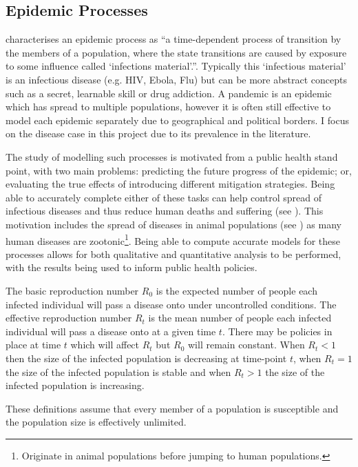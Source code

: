 \documentclass[11pt,a4paper]{article}
\theoremstyle{break}
\begin{document}
\subsection{Epidemic Processes}

  \par \cite[]{epidemic_process_in_an_open_population} characterises an epidemic process as ``a time-dependent process of transition by the members of a population, where the state transitions are caused by exposure to some influence called `infections material'.''. Typically this `infectious material' is an infectious disease (e.g. HIV, Ebola, Flu) but can be more abstract concepts such as a secret, learnable skill or drug addiction. A pandemic is an epidemic which has spread to multiple populations, however it is often still effective to model each epidemic separately due to geographical and political borders. I focus on the disease case in this project due to its prevalence in the literature.

  \par The study of modelling such processes is motivated from a public health stand point, with two main problems: predicting the future progress of the epidemic; or, evaluating the true effects of introducing different mitigation strategies. Being able to accurately complete either of these tasks can help control spread of infectious diseases and thus reduce human deaths and suffering (see \cite[]{mitigation_measures_for_pandemic_influence_in_italy}). This motivation includes the spread of diseases in animal populations (see \cite[]{dynamic_model_of_bovine_tb_spread_and_control_in_great_britain}) as many human diseases are zootonic\footnote{Originate in animal populations before jumping to human populations.}. Being able to compute accurate models for these processes allows for both qualitative and quantitative analysis to be performed, with the results being used to inform public health policies.

  \begin{box_definition}
    The basic reproduction number $R_0$ is the expected number of people each infected individual will pass a disease onto under uncontrolled conditions. The effective reproduction number $R_t$ is the mean number of people each infected individual will pass a disease onto at a given time $t$. There may be policies in place at time $t$ which will affect $R_t$ but $R_0$ will remain constant. When $R_t<1$ then the size of the infected population is decreasing at time-point $t$, when $R_t=1$ the size of the infected population is stable and when $R_t>1$ the size of the infected population is increasing.
    \par These definitions assume that every member of a population is susceptible and the population size is effectively unlimited.
  \end{box_definition}
\end{document}
